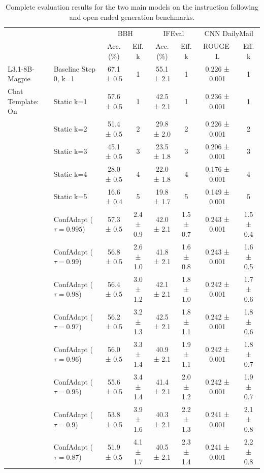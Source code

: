 \documentclass{article}
\theoremstyle{plain}
\theoremstyle{definition}
\theoremstyle{remark}
\begin{document}
\begin{table}[h!]
\small
\caption{Complete evaluation results for the two main models on the instruction following and open ended generation benchmarks.}
\label{tab:general-evals}
\centering
\begin{tabular}{llcccccc}
\toprule
 &  & \multicolumn{2}{c}{BBH} & \multicolumn{2}{c}{IFEval} & \multicolumn{2}{c}{CNN DailyMail} \\
 &  & Acc. (\%) & Eff. k & Acc. (\%) & Eff. k & ROUGE-L & Eff. k \\
\midrule
L3.1-8B-Magpie & Baseline Step 0, k=1 & 67.1 ± 0.5 & 1 & 55.1 ± 2.1 & 1 & 0.226 ± 0.001 & 1 \\
 Chat Template: On & Static k=1 & 57.6 ± 0.5 & 1 & 42.5 ± 2.1 & 1 & 0.236 ± 0.001 & 1 \\
 & Static k=2 & 51.4 ± 0.5 & 2 & 29.8 ± 2.0 & 2 & 0.226 ± 0.001 & 2 \\
 & Static k=3 & 45.1 ± 0.5 & 3 & 23.5 ± 1.8 & 3 & 0.206 ± 0.001 & 3 \\
 & Static k=4 & 28.0 ± 0.5 & 4 & 22.0 ± 1.8 & 4 & 0.176 ± 0.001 & 4 \\
 & Static k=5 & 16.6 ± 0.4 & 5 & 19.8 ± 1.7 & 5 & 0.149 ± 0.001 & 5 \\
 & ConfAdapt ($\tau=0.995$) & 57.3 ± 0.5 & 2.4 ± 0.9 & 42.0 ± 2.1 & 1.5 ± 0.7 & 0.243 ± 0.001 & 1.5 ± 0.4 \\
 & ConfAdapt ($\tau=0.99$) & 56.8 ± 0.5 & 2.6 ± 1.0 & 41.8 ± 2.1 & 1.6 ± 0.8 & 0.243 ± 0.001 & 1.6 ± 0.5 \\
 & ConfAdapt ($\tau=0.98$) & 56.4 ± 0.5 & 3.0 ± 1.2 & 42.1 ± 2.1 & 1.8 ± 1.0 & 0.242 ± 0.001 & 1.7 ± 0.6 \\
 & ConfAdapt ($\tau=0.97$) & 56.2 ± 0.5 & 3.2 ± 1.3 & 42.5 ± 2.1 & 1.8 ± 1.1 & 0.242 ± 0.001 & 1.8 ± 0.6 \\
 & ConfAdapt ($\tau=0.96$) & 56.0 ± 0.5 & 3.3 ± 1.4 & 40.9 ± 2.1 & 1.9 ± 1.1 & 0.242 ± 0.001 & 1.8 ± 0.7 \\
 & ConfAdapt ($\tau=0.95$) & 55.6 ± 0.5 & 3.4 ± 1.4 & 41.4 ± 2.1 & 2.0 ± 1.2 & 0.242 ± 0.001 & 1.9 ± 0.7 \\
 & ConfAdapt ($\tau=0.9$) & 53.8 ± 0.5 & 3.9 ± 1.6 & 40.3 ± 2.1 & 2.2 ± 1.3 & 0.241 ± 0.001 & 2.1 ± 0.8 \\
 & ConfAdapt ($\tau=0.87$) & 51.9 ± 0.5 & 4.1 ± 1.7 & 40.5 ± 2.1 & 2.3 ± 1.4 & 0.241 ± 0.001 & 2.2 ± 0.8 \\

\end{tabular}
\end{table}
\end{document}
